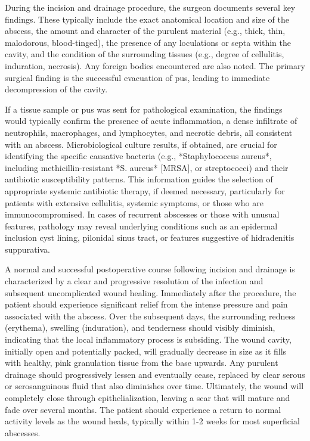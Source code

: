 During the incision and drainage procedure, the surgeon documents several key findings. These typically include the exact anatomical location and size of the abscess, the amount and character of the purulent material (e.g., thick, thin, malodorous, blood-tinged), the presence of any loculations or septa within the cavity, and the condition of the surrounding tissues (e.g., degree of cellulitis, induration, necrosis). Any foreign bodies encountered are also noted. The primary surgical finding is the successful evacuation of pus, leading to immediate decompression of the cavity.

If a tissue sample or pus was sent for pathological examination, the findings would typically confirm the presence of acute inflammation, a dense infiltrate of neutrophils, macrophages, and lymphocytes, and necrotic debris, all consistent with an abscess. Microbiological culture results, if obtained, are crucial for identifying the specific causative bacteria (e.g., *Staphylococcus aureus*, including methicillin-resistant *S. aureus* [MRSA], or streptococci) and their antibiotic susceptibility patterns. This information guides the selection of appropriate systemic antibiotic therapy, if deemed necessary, particularly for patients with extensive cellulitis, systemic symptoms, or those who are immunocompromised. In cases of recurrent abscesses or those with unusual features, pathology may reveal underlying conditions such as an epidermal inclusion cyst lining, pilonidal sinus tract, or features suggestive of hidradenitis suppurativa.

A normal and successful postoperative course following incision and drainage is characterized by a clear and progressive resolution of the infection and subsequent uncomplicated wound healing. Immediately after the procedure, the patient should experience significant relief from the intense pressure and pain associated with the abscess. Over the subsequent days, the surrounding redness (erythema), swelling (induration), and tenderness should visibly diminish, indicating that the local inflammatory process is subsiding. The wound cavity, initially open and potentially packed, will gradually decrease in size as it fills with healthy, pink granulation tissue from the base upwards. Any purulent drainage should progressively lessen and eventually cease, replaced by clear serous or serosanguinous fluid that also diminishes over time. Ultimately, the wound will completely close through epithelialization, leaving a scar that will mature and fade over several months. The patient should experience a return to normal activity levels as the wound heals, typically within 1-2 weeks for most superficial abscesses.

